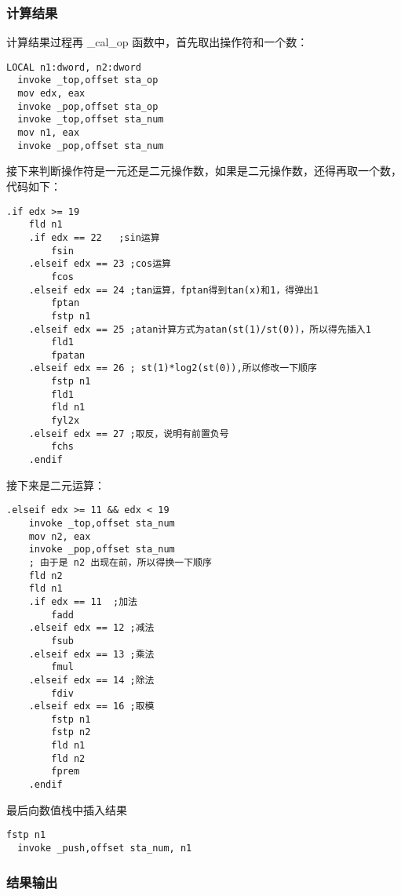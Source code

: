 \documentclass[proposal-report]{bitart}
\begin{document}
\subsubsection{计算结果}

计算结果过程再 \_cal\_op 函数中，首先取出操作符和一个数：

\begin{lstlisting}[language={[x86masm]Assembler}]
  LOCAL n1:dword, n2:dword
  invoke _top,offset sta_op
  mov edx, eax
  invoke _pop,offset sta_op
  invoke _top,offset sta_num
  mov n1, eax
  invoke _pop,offset sta_num
\end{lstlisting}

接下来判断操作符是一元还是二元操作数，如果是二元操作数，还得再取一个数，代码如下：

\begin{lstlisting}[language={[x86masm]Assembler}]
  .if edx >= 19
    fld n1
    .if edx == 22   ;sin运算
        fsin
    .elseif edx == 23 ;cos运算
        fcos
    .elseif edx == 24 ;tan运算，fptan得到tan(x)和1，得弹出1
        fptan
        fstp n1
    .elseif edx == 25 ;atan计算方式为atan(st(1)/st(0))，所以得先插入1
        fld1
        fpatan
    .elseif edx == 26 ; st(1)*log2(st(0)),所以修改一下顺序
        fstp n1
        fld1 
        fld n1
        fyl2x
    .elseif edx == 27 ;取反，说明有前置负号
        fchs
    .endif
\end{lstlisting}

接下来是二元运算：

\begin{lstlisting}[language={[x86masm]Assembler}]
  .elseif edx >= 11 && edx < 19
    invoke _top,offset sta_num
    mov n2, eax
    invoke _pop,offset sta_num
    ; 由于是 n2 出现在前，所以得换一下顺序
    fld n2
    fld n1
    .if edx == 11  ;加法
        fadd
    .elseif edx == 12 ;减法 
        fsub
    .elseif edx == 13 ;乘法
        fmul
    .elseif edx == 14 ;除法
        fdiv 
    .elseif edx == 16 ;取模
        fstp n1
        fstp n2
        fld n1
        fld n2
        fprem
    .endif
\end{lstlisting}

最后向数值栈中插入结果

\begin{lstlisting}[language={[x86masm]Assembler}]
  fstp n1
  invoke _push,offset sta_num, n1
\end{lstlisting}

\subsubsection{结果输出}
\end{document}
